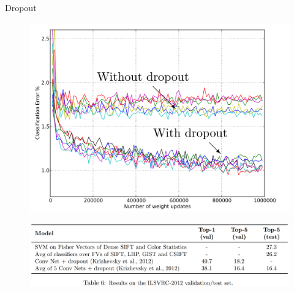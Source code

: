 \documentclass[10pt]{beamer}
\theoremstyle{remark}
\theoremstyle{definition}
\begin{document}
\begin{frame}{Dropout}
    \begin{figure}
    \centering
    \includegraphics[width=1.0\textwidth,height=0.5\textheight,keepaspectratio]{./images/dropout_3.png}
    \end{figure}

    \begin{figure}
    \centering
    \includegraphics[width=1.0\textwidth,height=0.5\textheight,keepaspectratio]{./images/dropout_4.png}
    \end{figure}

\end{frame}
\end{document}
